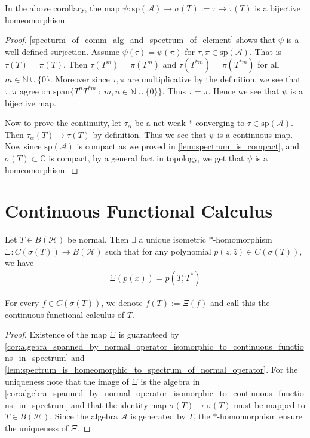 \begin{lemma}
  \label{lem:spectrum_is_homeomorphic_to_spectrum_of_normal_operator}
  In the above corollary, the map $\psi: \textrm{sp}(\mathcal{A}) \to
  \sigma(T) := \tau \mapsto \tau(T)$ is a bijective homeomorphism.
\end{lemma}
\begin{proof}
  \autoref{specturm_of_comm_alg_and_spectrum_of_element} shows that
  $\psi$ is a well defined surjection. Assume $\psi(\tau) =
  \psi(\pi)$ for $ \tau, \pi \in \textrm{sp}(\mathcal{A})$.
  That is $\tau(T) = \pi(T)$. Then $\tau(T^m) = \pi(T^m)$
  and $\tau(T^{*m}) = \pi(T^{*m})$ for all $m \in \mathbb{N} \cup \{
  0 \}$. Moreover since $\tau, \pi$ are multiplicative by the
  definition, we see that $\tau, \pi$ agree on $\textrm{span}\{
  T^nT^{*m}  \ : \   m, n \in \mathbb{N} \cup \{ 0 \} \}$. Thus $\tau
  = \pi$. Hence we see that $\psi$ is a bijective map.

  Now to prove the continuity, let $\tau_\alpha$ be a net weak * converging
  to $\tau \in \textrm{sp}(\mathcal{A})$. Then $\tau_\alpha(T) \to
  \tau(T)$ by definition. Thus we see that $\psi$ is a continuous
  map. Now since $\textrm{sp}(\mathcal{A})$ is compact as we proved
  in \autoref{lem:spectrum_is_compact}, and $\sigma(T) \subset
  \mathbb{C}$ is compact, by a general fact in topology, we get that
  $\psi$ is a homeomorphism.
\end{proof}

\section{Continuous Functional Calculus}

\begin{theorem}
  Let $T \in B(\mathcal{H})$ be normal. Then $\exists$ a unique
  isometric $*$-homomorphism $\Xi: C(\sigma(T)) \to  B(\mathcal{H})$
  such that for any polynomial $p(z, \bar{z}) \in C(\sigma(T))$, we have
  \begin{align*}
    \Xi(p(x)) = p(T, T^*)
  \end{align*}

  For every $f \in C(\sigma(T))$, we denote $f(T) := \Xi(f)$ and call
  this the continuous functional calculus of $T$.
\end{theorem}
\begin{proof}
  Existence of the map $\Xi$ is guaranteed by
  \autoref{cor:algebra_spanned_by_normal_operator_isomorphic_to_continuous_functions_in_spectrum}
  and \autoref{lem:spectrum_is_homeomorphic_to_spectrum_of_normal_operator}.
  For the uniqueness note that the image of $\Xi$ is the algebra in
  \autoref{cor:algebra_spanned_by_normal_operator_isomorphic_to_continuous_functions_in_spectrum}
  and that the identity map $\sigma(T) \to
  \sigma(T)$ must be mapped to $T \in B(\mathcal{H})$.
  Since the algebra $\mathcal{A}$ is generated by $T$, the
  $*$-homomorphism ensure the uniqueness of $\Xi$.
\end{proof}


